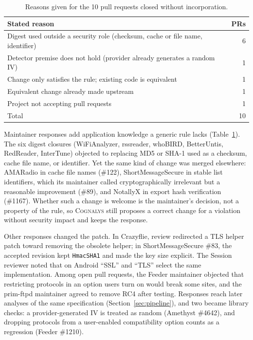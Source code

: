 \documentclass[conference]{IEEEtran}
\newcommand{\system}{\textsc{Cognalys}}
\begin{document}
\begin{table}[H]
\centering
\caption{Reasons given for the 10 pull requests closed without
incorporation.}
\label{tab:closures}
\footnotesize
\begin{tabular}{p{5.8cm}r}
\toprule
Stated reason & PRs \\
\midrule
Digest used outside a security role (checksum, cache or file name,
identifier) & 6 \\
Detector premise does not hold (provider already generates a random IV) & 1 \\
Change only satisfies the rule; existing code is equivalent & 1 \\
Equivalent change already made upstream & 1 \\
Project not accepting pull requests & 1 \\
\midrule
Total & 10 \\
\bottomrule
\end{tabular}
\end{table}

Maintainer responses add application knowledge a generic rule lacks
(Table~\ref{tab:closures}). The six digest closures (WiFiAnalyzer, rssreader,
whoBIRD, BetterUntis, RedReader, InterTune) objected to replacing MD5 or SHA-1
used as a checksum, cache file name, or identifier. Yet the same kind of
change was merged elsewhere: AMARadio in cache file names (\#122),
ShortMessageSecure in stable list identifiers, which its maintainer called
cryptographically irrelevant but a reasonable improvement (\#89), and NotallyX
in export hash verification (\#1167). Whether such a change is welcome is the
maintainer's decision, not a property of the rule, so {\system} still proposes
a correct change for a violation without security impact and keeps the
response.

Other responses changed the patch. In Crazyflie, review redirected a TLS
helper patch toward removing the obsolete helper; in ShortMessageSecure \#83,
the accepted revision kept \texttt{HmacSHA1} and made the key size explicit.
The Session reviewer noted that on Android ``SSL'' and ``TLS'' select the same
implementation. Among open pull requests, the Feeder maintainer objected
that restricting protocols in an option users turn on would break some sites,
and the prim-ftpd maintainer agreed to remove RC4 after testing. Responses
reach later analyses of the same specification (Section~\ref{sec:pipeline}),
and two became library checks: a provider-generated IV is treated as random
(Amethyst \#4642), and dropping protocols from a user-enabled compatibility
option counts as a regression (Feeder \#1210).
\end{document}
